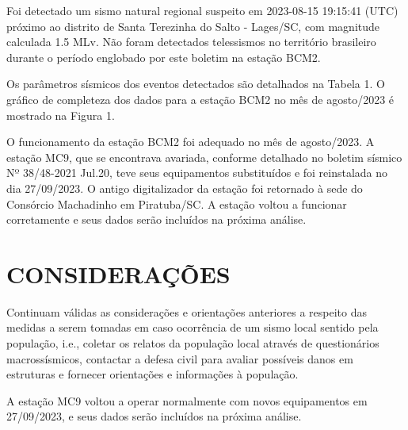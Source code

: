Foi detectado um sismo natural regional suspeito em 2023-08-15 19:15:41 (UTC) próximo ao distrito de Santa Terezinha do Salto - Lages/SC, com magnitude calculada 1.5 MLv. Não foram detectados telessismos no território brasileiro durante o período englobado por este boletim na estação BCM2.

Os parâmetros sísmicos dos eventos detectados são detalhados na Tabela 1. O gráfico de completeza dos dados para a estação BCM2 no mês de agosto/2023 é mostrado na Figura 1.

O funcionamento da estação BCM2 foi adequado no mês de agosto/2023. A estação MC9, que se encontrava avariada, conforme detalhado no boletim sísmico Nº 38/48-2021 Jul.20, teve seus equipamentos substituídos e foi reinstalada no dia 27/09/2023. O antigo digitalizador da estação foi retornado à sede do Consórcio Machadinho em Piratuba/SC. A estação voltou a funcionar corretamente e seus dados serão incluídos na próxima análise.

\section{CONSIDERAÇÕES}
\label{sec:consideracoes}
Continuam válidas as considerações e orientações anteriores a respeito das medidas a serem tomadas em caso ocorrência de um sismo local sentido pela população, i.e., coletar os relatos da população local através de questionários macrossísmicos, contactar a defesa civil para avaliar possíveis danos em estruturas e fornecer orientações e informações à população.

A estação MC9 voltou a operar normalmente com novos equipamentos em 27/09/2023, e seus dados serão incluídos na próxima análise.

\assinaturaLucas
